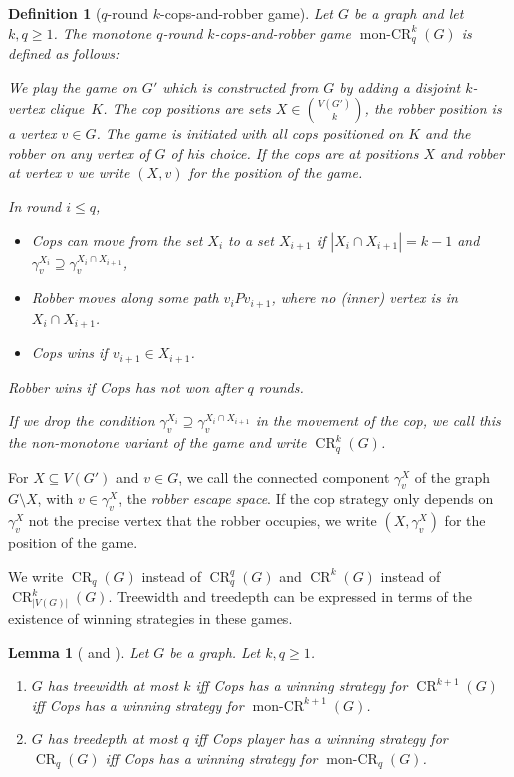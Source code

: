 \documentclass[10pt,a4paper]{article}
\newtheorem{lemma}[theorem]{Lemma}
\newtheorem{definition}[theorem]{Definition}
\DeclareMathOperator{\CR}{CR}
\DeclareMathOperator{\monCR}{mon-CR}
\begin{document}
\begin{definition}[$q$-round $k$-cops-and-robber game]
	\label{def:Ekq-cops}
	Let $G$ be a graph and let $k,q\geq 1$.
	The \emph{monotone $q$-round $k$-cops-and-robber game} $\monCR_q^{k}(G)$ is defined as follows:
	
	We play the game on $G'$ which is constructed from $G$ by adding a disjoint $k$-vertex clique~$K$.
	The cop positions are sets $X\in \binom{V(G')}k$, the robber position is a vertex $v\in G$.
	The game is initiated with all cops positioned on $K$ and the robber on any vertex of $G$ of his choice.
	If the cops are at positions $X$ and robber at vertex $v$ we write $(X,v)$ for the position of the game.
	
	In round $i\leq q$, 
	\begin{itemize}
		\item Cops can move from the set $X_i$ to a set $X_{i+1}$ if $|X_i\cap X_{i+1}|=k-1$ and $\gamma_{v}^{X_{i}}\supseteq \gamma_{v}^{X_i\cap X_{i+1}}$,
		\item Robber moves along some path $v_iPv_{i+1}$, where no (inner) vertex is in $X_i\cap X_{i+1}$.
		\item Cops wins if $v_{i+1}\in X_{i+1}$.
	\end{itemize}
	Robber wins if Cops has not won after $q$ rounds.
	
	If we drop the condition $\gamma_{v}^{X_{i}}\supseteq \gamma_{v}^{X_i\cap X_{i+1}}$ in the movement of the cop, we call this the \emph{non-monotone} variant of the game and write $\CR_q^{k}(G)$.
\end{definition}

For $X\subseteq V(G')$ and $v\in G$, we call the connected component $\gamma^X_v$ of the graph $G\setminus X$, with $v\in \gamma^X_v$, the \emph{robber escape space}.
If the cop strategy only depends on $\gamma^X_v$ not the precise vertex that the robber occupies, we write $(X,\gamma^X_v)$ for the position of the game.

We write $\CR_q(G)$ instead of $\CR_q^q(G)$ and $\CR^k(G)$ instead of $\CR_{|V(G)|}^k(G)$.
Treewidth and treedepth can be expressed in terms of the existence of winning strategies in these games.



\begin{lemma}[{\cite[Theorem~1.4]{seymour_graph_1993}} and {\cite[Theorem~4]{giannopoulou_lifo-search_2012}}] \label{lem:games}
  Let $G$ be a graph. Let $k,q \geq 1$.
  \begin{enumerate}
  \item $G$ has treewidth at most $k$ iff Cops has a winning strategy for $\CR^{k+1}(G)$ iff Cops has a winning strategy for $\monCR^{k+1}(G)$.
  \item $G$ has treedepth at most $q$ iff Cops player has a winning strategy for $\CR_q(G)$ iff Cops has a winning strategy for $\monCR_q(G)$.
  \end{enumerate}
\end{lemma}
\end{document}
